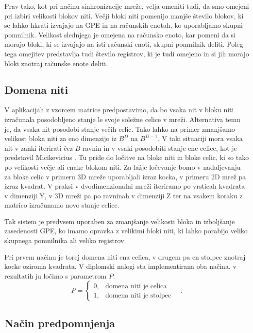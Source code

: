 \documentclass[a4paper, 12pt, openright]{book}
\begin{document}
Prav tako, kot pri načinu sinhronizacije mreže, velja omeniti tudi, da smo omejeni pri izbiri velikosti blokov niti.
Večji bloki niti pomenijo manjše število blokov, ki se lahko hkrati izvajajo na GPE in na računskih enotah, ko uporabljamo skupni pomnilnik. Velikost slednjega je omejena na računsko enoto, kar pomeni da si morajo bloki, ki se izvajajo na isti računski enoti, skupni pomnilnik deliti.
Poleg tega omejitev predstavlja tudi število registrov, ki je tudi omejeno in si jih morajo bloki znotraj računske enote deliti.

\subsection{Domena niti}

V aplikacijah z vzorcem matrice predpostavimo, da bo vsaka nit v bloku niti izračunala posodobljeno stanje le svoje soležne celice v mreži.
Alternativa temu je, da vsaka nit posodobi stanje večih celic. Tako lahko na primer zmanjšamo velikost bloka niti za eno dimenzijo iz \(B^D\) na \(B^{D-1}\).
V taki situaciji mora vsaka nit v zanki iterirati čez \(B\) ravnin in v vsaki posodobiti stanje ene celice, kot je predstavil Micikevicius \cite{10.1145/1513895.1513905}.
Tu pride do ločitve na bloke niti in bloke celic, ki so tako po velikosti večje ali enake blokom niti.
Za lažje ločevanje bomo v nadaljevanju za bloke celic v primeru 3D mreže uporabljali izraz kocka, v primeru 2D mrež pa izraz kvadrat.
V praksi v dvodimenzionalni mreži iteriramo po vrsticah kvadrata v dimenziji Y, v 3D mreži pa po ravninah v dimenziji Z ter na vsakem koraku z matrico izračunamo novo stanje celice.

Tak sistem je predvsem uporaben za zmanjšanje velikosti bloka in izboljšanje zasedenosti GPE, ko imamo opravka z velikimi bloki niti, ki lahko porabijo veliko skupnega pomnilnika ali veliko registrov.

Pri prvem načinu je torej domena niti ena celica, v drugem pa en stolpec znotraj kocke oziroma kvadrata. V diplomski nalogi sta implementirana oba načina, v rezultatih ju ločimo s parametrom \(P\):
\begin{displaymath}
    P = \begin{cases}
        0, & \text{domena niti je celica}    \\
        1, & \text{domena niti je stolpec}
    \end{cases}\quad.
\end{displaymath}

\subsection{Način predpomnjenja}
\end{document}
